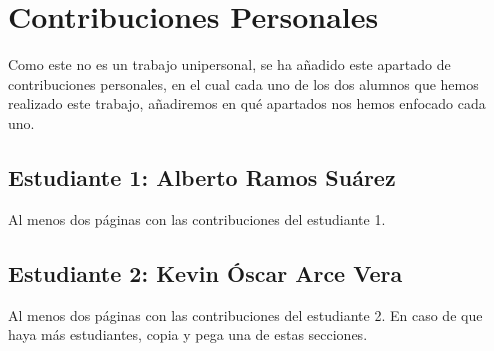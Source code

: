 \chapter*{Contribuciones Personales}
\label{cap:contribucionesPersonales}

Como este no es un trabajo unipersonal, se ha añadido este apartado de contribuciones personales, en el cual cada uno de los dos alumnos que hemos realizado este trabajo, añadiremos en qué apartados nos hemos enfocado cada uno.

\section*{Estudiante 1: Alberto Ramos Suárez}
Al menos dos páginas con las contribuciones del estudiante 1.

\section*{Estudiante 2: Kevin Óscar Arce Vera}
Al menos dos páginas con las contribuciones del estudiante 2. En caso de que haya más estudiantes, copia y pega una de estas secciones.

